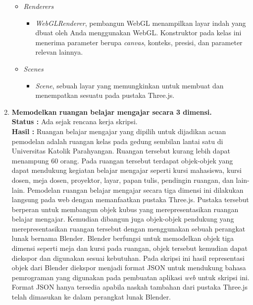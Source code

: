 \documentclass[a4paper,twoside]{article}
\begin{document}
\begin{enumerate}
\begin{itemize}
\item \textit{Renderers}
	\begin{itemize}
	\item {\it WebGLRenderer}, pembangun WebGL menampilkan layar indah yang dbuat oleh Anda menggunakan WebGL. Konstruktor pada kelas ini menerima parameter berupa {\it canvas}, konteks, presisi, dan parameter relevan lainnya.
	\end{itemize}
		
\item \textit{Scenes}
	\begin{itemize}
	\item {\it Scene}, sebuah layar yang memungkinkan untuk membuat dan menempatkan sesuatu pada pustaka Three.js. 
	\end{itemize}
\end{itemize}


		\item \textbf{Memodelkan ruangan belajar mengajar secara 3 dimensi.}\\
		{\bf Status :} Ada sejak rencana kerja skripsi.\\
		{\bf Hasil :} Ruangan belajar mengajar yang dipilih untuk dijadikan acuan pemodelan adalah ruangan kelas pada gedung sembilan lantai satu di Universitas Katolik Parahyangan. Ruangan tersebut kurang lebih dapat menampung 60 orang. Pada ruangan tersebut terdapat objek-objek yang dapat mendukung kegiatan belajar mengajar seperti kursi mahasiswa, kursi dosen, meja dosen, proyektor, layar, papan tulis, pendingin ruangan, dan lain-lain. Pemodelan ruangan belajar mengajar secara tiga dimensi ini dilakukan langsung pada web dengan memanfaatkan pustaka Three.js. Pustaka tersebut berperan untuk membangun objek kubus yang merepresentasikan ruangan belajar mengajar. Kemudian dibangun juga objek-objek pendukung yang merepresentasikan ruangan tersebut dengan menggunakan sebuah perangkat lunak bernama Blender. Blender berfungsi untuk memodelkan objek tiga dimensi seperti meja dan kursi pada ruangan, objek tersebut kemudian dapat diekspor dan digunakan sesuai kebutuhan. Pada skripsi ini hasil representasi objek dari Blender diekspor menjadi format JSON untuk mendukung bahasa pemrograman yang digunakan pada pembuatan aplikasi {\it web} untuk skripsi ini. Format JSON hanya tersedia apabila naskah tambahan dari pustaka Three.js telah dimasukan ke dalam perangkat lunak Blender.


\end{enumerate}
\end{document}
